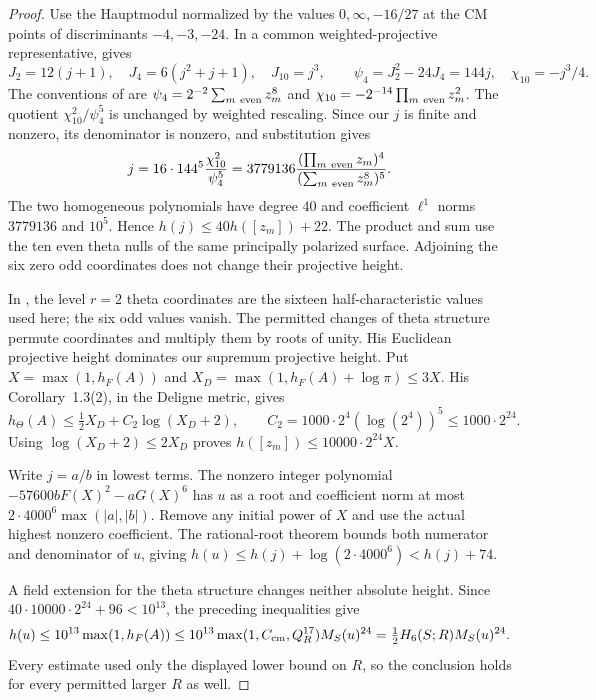 \documentclass[11pt]{article}
\theoremstyle{definition}
\theoremstyle{remark}
\begin{document}
\begin{proof}
Use the Hauptmodul normalized by the values $0,\infty,-16/27$
at the CM points of discriminants $-4,-3,-24$.
In a common weighted-projective representative,
\cite[equations (2) and (14), pp.~3 and 17]{linyang} gives
\[
 J_2=12(j+1),\quad J_4=6(j^2+j+1),\quad J_{10}=j^3,
 \qquad \psi_4=J_2^2-24J_4=144j,\quad \chi_{10}=-j^3/4.
\]
The conventions of \cite[\S2.2, p.~4]{lny} are
$\psi_4=2^{-2}\sum_{m\ {\rm even}}z_m^8$ and
$\chi_{10}=-2^{-14}\prod_{m\ {\rm even}}z_m^2$.
The quotient $\chi_{10}^2/\psi_4^5$ is unchanged by weighted
rescaling. Since our $j$ is finite and nonzero, its denominator
is nonzero, and substitution gives
\[
 j=16\cdot144^5\frac{\chi_{10}^2}{\psi_4^5}
  =3779136\frac{(\prod_{m\ {\rm even}}z_m)^4}
                 {(\sum_{m\ {\rm even}}z_m^8)^5}.
\]
The two homogeneous polynomials have degree $40$ and coefficient
$\ell^1$ norms $3779136$ and $10^5$. Hence
$h(j)\le40h([z_m])+22$.
The product and sum use the ten even theta nulls of the same
principally polarized surface. Adjoining the six zero odd
coordinates does not change their projective height.

In \cite{pazuki}, the level $r=2$ theta coordinates are the sixteen
half-characteristic values used here; the six odd values vanish.
The permitted changes of theta structure permute coordinates and
multiply them by roots of unity. His Euclidean projective height
dominates our supremum projective height. Put
$X=\max(1,h_F(A))$ and
$X_D=\max(1,h_F(A)+\log\pi)\le3X$.
His Corollary~1.3(2), in the Deligne metric, gives
\[
 h_\Theta(A)\le\tfrac12 X_D+C_2\log(X_D+2),
 \qquad C_2=1000\cdot2^4(\log(2^4))^5\le1000\cdot2^{24}.
\]
Using $\log(X_D+2)\le2X_D$ proves
$h([z_m])\le10000\cdot2^{24}X$.

Write $j=a/b$ in lowest terms. The nonzero integer polynomial
$-57600bF(X)^2-aG(X)^6$ has $u$ as a root and coefficient norm at
most $2\cdot4000^6\max(|a|,|b|)$. Remove any initial power of $X$
and use the actual highest nonzero coefficient. The rational-root
theorem bounds both numerator and denominator of $u$, giving
$h(u)\le h(j)+\log(2\cdot4000^6)<h(j)+74$.

A field extension for the theta structure changes neither absolute
height. Since $40\cdot10000\cdot2^{24}+96<10^{13}$, the preceding
inequalities give
\[
 h(u)\le10^{13}\max(1,h_F(A))
 \le10^{13}\max(1,C_{\rm cm},Q_R^{17})M_S(u)^{24}
 =\tfrac12 H_6(S;R)M_S(u)^{24}.
\]
Every estimate used only the displayed lower bound on $R$, so the
conclusion holds for every permitted larger $R$ as well.
\end{proof}
\end{document}
